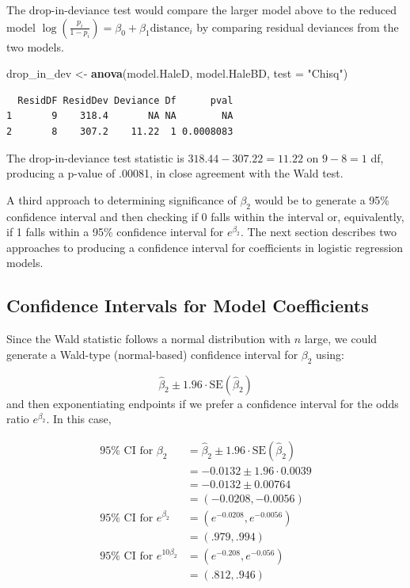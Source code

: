 \documentclass[
]{krantz}
\newenvironment{Shaded}{\begin{snugshade}}{\end{snugshade}}
\newcommand{\AttributeTok}[1]{\textcolor[rgb]{0.27,0.27,0.27}{#1}}
\newcommand{\FunctionTok}[1]{\textcolor[rgb]{0.27,0.27,0.27}{\textbf{#1}}}
\newcommand{\NormalTok}[1]{#1}
\newcommand{\OtherTok}[1]{\textcolor[rgb]{0.37,0.37,0.37}{#1}}
\newcommand{\StringTok}[1]{\textcolor[rgb]{0.5,0.5,0.5}{#1}}
\begin{document}
The drop-in-deviance test would compare the larger model above to the reduced model \(\log\left(\frac{p_i}{1-p_i}\right) = \beta_0+\beta_1\textrm{distance}_i\) by comparing residual deviances from the two models.

\begin{Shaded}
\begin{Highlighting}[]
\NormalTok{drop\_in\_dev }\OtherTok{\textless{}{-}} \FunctionTok{anova}\NormalTok{(model.HaleD, model.HaleBD, }\AttributeTok{test =} \StringTok{"Chisq"}\NormalTok{)}
\end{Highlighting}
\end{Shaded}

\begin{verbatim}
  ResidDF ResidDev Deviance Df      pval
1       9    318.4       NA NA        NA
2       8    307.2    11.22  1 0.0008083
\end{verbatim}

The drop-in-deviance test statistic is \(318.44 - 307.22 = 11.22\) on \(9 - 8 = 1\) df, producing a p-value of .00081, in close agreement with the Wald test.

A third approach to determining significance of \(\beta_2\) would be to generate a 95\% confidence interval and then checking if 0 falls within the interval or, equivalently, if 1 falls within a 95\% confidence interval for \(e^{\beta_2}.\) The next section describes two approaches to producing a confidence interval for coefficients in logistic regression models.

\subsection{Confidence Intervals for Model Coefficients}\label{confidence-intervals-for-model-coefficients}

Since the Wald statistic follows a normal distribution with \(n\) large, we could generate a Wald-type (normal-based) confidence interval  for \(\beta_2\) using:

\[\hat\beta_2 \pm 1.96\cdot\textrm{SE}(\hat\beta_2)\]
and then exponentiating endpoints if we prefer a confidence interval for the odds ratio \(e^{\beta_2}\). In this case,

\begin{align*}
95\% \textrm{ CI for } \beta_2 &= \hat{\beta}_2 \pm 1.96 \cdot \textrm{SE}(\hat{\beta}_2) \\
                               &= -0.0132 \pm 1.96 \cdot 0.0039 \\
                               &= -0.0132 \pm 0.00764 \\
                               &= (-0.0208, -0.0056) \\
95\% \textrm{ CI for } e^{\beta_2} &= (e^{-0.0208}, e^{-0.0056}) \\
                                   &= (.979, .994) \\
95\% \textrm{ CI for } e^{10\beta_2} &= (e^{-0.208}, e^{-0.056}) \\
                                      &= (.812, .946)
\end{align*}
\end{document}
